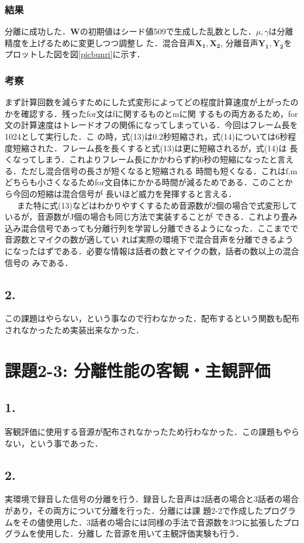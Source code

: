 \documentclass[a4j]{jarticle}
\begin{document}
\subsubsection*{結果}
分離に成功した．$\bm{W}$の初期値はシード値509で生成した乱数とした．$\mu, \gamma$は分離精度を上げるために変更しつつ調整し
た．混合音声$\bm{X_1}, \bm{X_2}$, 分離音声$\bm{Y_1}, \bm{Y_2}$をプロットした図を図\ref{picbunri}に示す．
\subsubsection*{考察}
まず計算回数を減らすためにした式変形によってどの程度計算速度が上がったのかを確認する．残ったfor文はfに関するものとmに関
するもの両方あるため，for文の計算速度はトレードオフの関係になってしまっている．今回はフレーム長を1024として実行した．こ
の時，式(13)は0.2秒短縮され，式(14)については6秒程度短縮された．フレーム長を長くすると式(13)は更に短縮されるが，式(14)は
長くなってしまう．これよりフレーム長にかかわらず約6秒の短縮になったと言える．ただし混合信号の長さが短くなると短縮される
時間も短くなる．これはf,mどちらも小さくなるためfor文自体にかかる時間が減るためである．このことから今回の短縮は混合信号が
長いほど威力を発揮すると言える．\\\ \ \
また特に式(13)などはわかりやすくするため音源数が2個の場合で式変形しているが，音源数がJ個の場合も同じ方法で実装することが
できる．これより畳み込み混合信号であっても分離行列を学習し分離できるようになった．ここまでで音源数とマイクの数が適してい
れば実際の環境下で混合音声を分離できるようになったはずである．必要な情報は話者の数とマイクの数，話者の数以上の混合信号の
みである．

\subsection*{2.}
この課題はやらない，という事なので行わなかった．配布するという関数も配布されなかったため実装出来なかった．

\section*{課題2-3: 分離性能の客観・主観評価}
\subsection*{1.}
客観評価に使用する音源が配布されなかったため行わなかった．この課題もやらない，という事であった．
\subsection*{2.}
実環境で録音した信号の分離を行う．録音した音声は2話者の場合と3話者の場合があり，その両方について分離を行った．分離には課
題2-2で作成したプログラムをその儘使用した．3話者の場合には同様の手法で音源数を3つに拡張したプログラムを使用した．分離し
た音源を用いて主観評価実験も行う．
\end{document}
